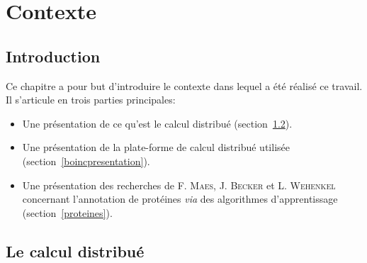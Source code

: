 \documentclass[a4paper, 11pt]{report}
\begin{document}

\chapter{Contexte}

\section{Introduction}
Ce chapitre a pour but d'introduire le contexte dans lequel a été réalisé ce travail. Il s'articule en trois parties principales:
\begin{itemize}
\item Une présentation de ce qu'est le calcul distribué (section~\ref{calculdistribue}).
\item Une présentation de la plate-forme de calcul distribué utilisée (section~\ref{boincpresentation}).
\item Une présentation des recherches de F. \textsc{Maes}, J. \textsc{Becker} et L. \textsc{Wehenkel} concernant l'annotation de protéines \textit{via} des algorithmes d'apprentissage (section~\ref{proteines}).
\end{itemize}

\section{Le calcul distribué}
\label{calculdistribue}
\end{document}

